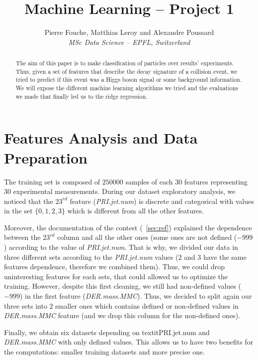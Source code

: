 \documentclass[10pt,conference,compsocconf]{IEEEtran}
\begin{document}
\title{Machine Learning -- Project 1}

\author{
  Pierre Fouche, Matthias Leroy and Alexandre Poussard\\
  \textit{MSc Data Science -- EPFL, Switzerland}
}

\maketitle

\begin{abstract}
  The aim of this paper is to make classification of particles over results' experiments. Thus, given a set of features that describe the decay signature of a collision event, we tried to predict if this event was a Higgs boson signal or some background information. We will expose the different machine learning algorithms we tried and the evaluations we made that finally led us to the ridge regression.
\end{abstract}

\section{Features Analysis and Data Preparation}

The training set is composed of $250 000$ samples of each $30$ features representing $30$ experimental measurements. During our dataset exploratory analysis, we noticed that the $23^{rd}$ feature (\textit{PRI.jet.num}) is discrete and categorical with values in the set $\{0,1,2,3\}$ which is different from all the other features. 

Moreover, the documentation of the contest (~\ref{sec:ref}) explained the dependence between the $23^{rd}$ column and all the other ones (some ones are not defined ($-999$) according to the value of \textit{PRI.jet.num}. That is why, we divided our data in three different sets according to the \textit{PRI.jet.num} values ($2$ and $3$ have the same features dependence, therefore we combined them). Thus, we could drop uninteresting features for each sets, that could allowed us to optimize the training. However, despite this first cleaning, we still had non-defined values ($-999$) in the first feature (\textit{DER.mass.MMC}). Thus, we decided to split again our three sets into $2$ smaller ones which contains defined or non-defined values in \textit{DER.mass.MMC} feature (and we drop this column for the non-defined ones).

Finally, we obtain six datasets depending on textit{PRI.jet.num} and \textit{DER.mass.MMC} with only defined values. This allows us to have two benefits for the computations: smaller training datasets and more precise one.
\end{document}
